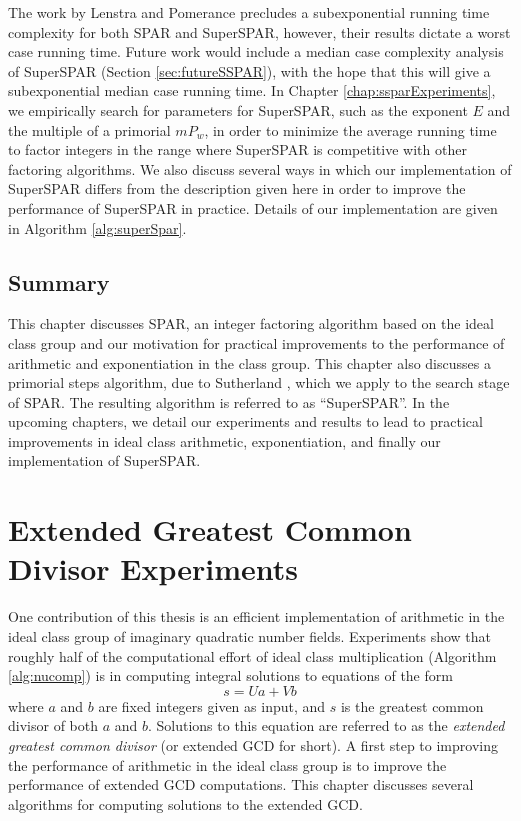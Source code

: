 \documentclass{ucalgthes1}
\theoremstyle{definition}
\begin{document}
The work by Lenstra and Pomerance \cite[\S 11]{Lenstra1992} precludes a subexponential running time complexity for both SPAR and SuperSPAR, however, their results dictate a worst case running time.  Future work would include a median case complexity analysis of SuperSPAR (Section \ref{sec:futureSSPAR}), with the hope that this will give a subexponential median case running time.  In Chapter \ref{chap:ssparExperiments}, we empirically search for parameters for SuperSPAR, such as the exponent $E$ and the multiple of a primorial $mP_w$, in order to minimize the average running time to factor integers in the range where SuperSPAR is competitive with other factoring algorithms.  We also discuss several ways in which our implementation of SuperSPAR differs from the description given here in order to improve the performance of SuperSPAR in practice.  Details of our implementation are given in Algorithm \ref{alg:superSpar}.

\section{Summary}

This chapter discusses SPAR, an integer factoring algorithm based on the ideal class group and our motivation for practical improvements to the performance of arithmetic and exponentiation in the class group.  This chapter also discusses a primorial steps algorithm, due to Sutherland \cite{Sutherland2007}, which we apply to the search stage of SPAR.   The resulting algorithm is referred to as ``SuperSPAR''.   In the upcoming chapters, we detail our experiments and results to lead to practical improvements in ideal class arithmetic, exponentiation, and finally our implementation of SuperSPAR.


\chapter{Extended Greatest Common Divisor Experiments}
\label{chap:xgcdExperiments}

One contribution of this thesis is an efficient implementation of arithmetic in the ideal class group of imaginary quadratic number fields.  Experiments show that roughly half of the computational effort of ideal class multiplication (Algorithm \ref{alg:nucomp}) is in computing integral solutions to equations of the form
\[
	s = Ua + Vb
\]
where $a$ and $b$ are fixed integers given as input, and $s$ is the greatest common divisor of both $a$ and $b$.  Solutions to this equation are referred to as the \emph{extended greatest common divisor} (or extended GCD for short).  A first step to improving the performance of arithmetic in the ideal class group is to improve the performance of extended GCD computations.  This chapter discusses several algorithms for computing solutions to the extended GCD.
\end{document}
